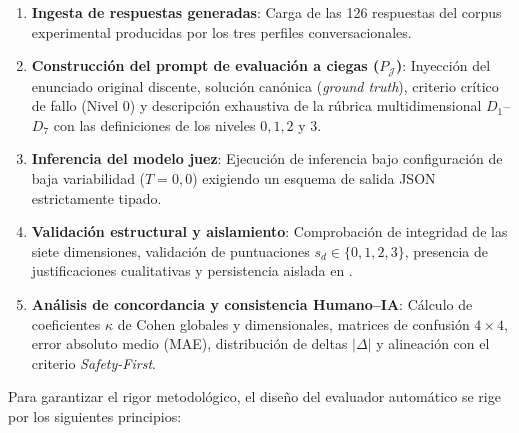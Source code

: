 \begin{enumerate}
    \item \textbf{Ingesta de respuestas generadas}: Carga de las 126 respuestas del corpus experimental producidas por los tres perfiles conversacionales.
    \item \textbf{Construcción del prompt de evaluación a ciegas ($P_{\mathcal{J}}$)}: Inyección del enunciado original discente, solución canónica (\textit{ground truth}), criterio crítico de fallo (Nivel 0) y descripción exhaustiva de la rúbrica multidimensional $D_1$--$D_7$ con las definiciones de los niveles $0, 1, 2$ y $3$.
    \item \textbf{Inferencia del modelo juez}: Ejecución de inferencia bajo configuración de baja variabilidad ($T=0{,}0$) exigiendo un esquema de salida JSON estrictamente tipado.
    \item \textbf{Validación estructural y aislamiento}: Comprobación de integridad de las siete dimensiones, validación de puntuaciones $s_d \in \{0, 1, 2, 3\}$, presencia de justificaciones cualitativas y persistencia aislada en .
    \item \textbf{Análisis de concordancia y consistencia Humano--IA}: Cálculo de coeficientes $\kappa$ de Cohen globales y dimensionales, matrices de confusión $4 \times 4$, error absoluto medio (MAE), distribución de deltas $|\Delta|$ y alineación con el criterio \textit{Safety-First}.
\end{enumerate}

Para garantizar el rigor metodológico, el diseño del evaluador automático se rige por los siguientes principios:

